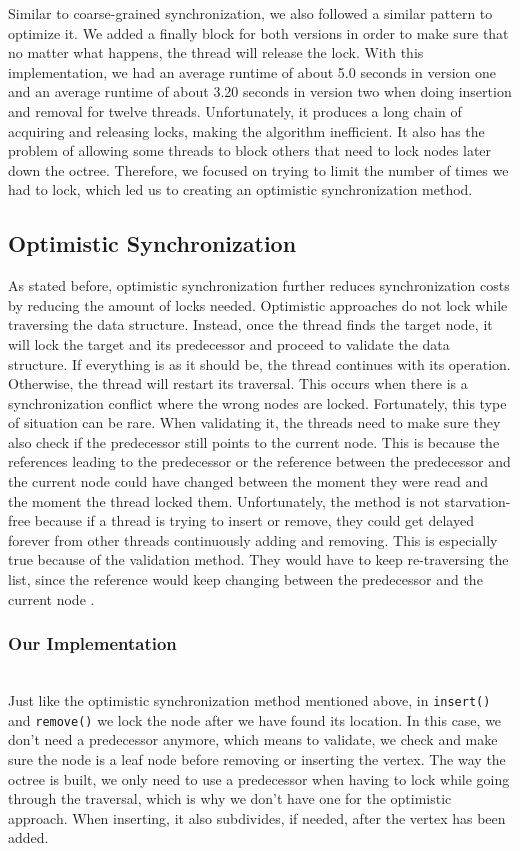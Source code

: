 \documentclass[conference]{IEEEtran}
\begin{document}
\indent \indent Similar to coarse-grained synchronization, we also followed a similar pattern to optimize it. We added a finally block for both versions in order to make sure that no matter what happens, the thread will release the lock. With this implementation, we had an average runtime of about 5.0 seconds in version one and an average runtime of about 3.20 seconds in version two when doing insertion and removal for twelve threads. Unfortunately, it produces a long chain of acquiring and releasing locks, making the algorithm inefficient. It also has the problem of allowing some threads to block others that need to lock nodes later down the octree. Therefore, we focused on trying to limit the number of times we had to lock, which led us to creating an optimistic synchronization method.


\subsection{Optimistic Synchronization}

As stated before, optimistic synchronization further reduces synchronization costs by reducing the amount of locks needed. Optimistic approaches do not lock while traversing the data structure. Instead, once the thread finds the target node, it will lock the target and its predecessor and proceed to validate the data structure. If everything is as it should be, the thread continues with its operation. Otherwise, the thread will restart its traversal. This occurs when there is a synchronization conflict where the wrong nodes are locked. Fortunately, this type of situation can be rare. When validating it, the threads need to make sure they also check if the predecessor still points to the current node. This is because the references leading to the predecessor or the reference between the predecessor and the current node could have changed between the moment they were read and the moment the thread locked them. Unfortunately, the method is not starvation-free because if a thread is trying to insert or remove, they could get delayed forever from other threads continuously adding and removing. This is especially true because of the validation method. They would have to keep re-traversing the list, since the reference would keep changing between the predecessor and the current node \cite{textbook}.

\subsubsection{Our Implementation}~\\
\indent \indent Just like the optimistic synchronization method mentioned above, in \verb|insert()| and \verb|remove()| we lock the node after we have found its location. In this case, we don't need a predecessor anymore, which means to validate, we check and make sure the node is a leaf node before removing or inserting the vertex. The way the octree is built, we only need to use a predecessor when having to lock while going through the traversal, which is why we don't have one for the optimistic approach. When inserting, it also subdivides, if needed, after the vertex has been added.
\end{document}
